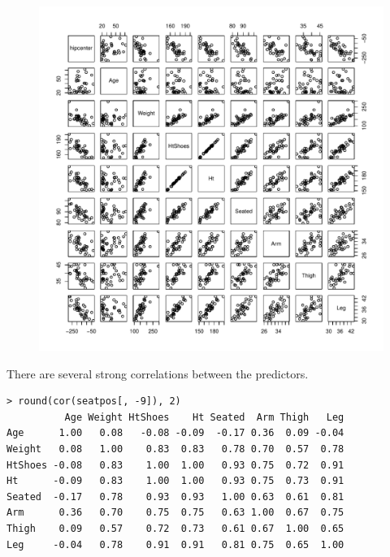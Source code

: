 \documentclass[10pt]{beamer}\usepackage[]{graphicx}\usepackage[]{color}
\begin{document}
\begin{frame}
\begin{figure}
\includegraphics[scale=0.5]{figure/seatpos_pairs.pdf}
\end{figure}
\end{frame}

\begin{frame}[fragile]
There are several strong correlations between the predictors.
\small
\begin{verbatim}
> round(cor(seatpos[, -9]), 2)
          Age Weight HtShoes    Ht Seated  Arm Thigh   Leg
Age      1.00   0.08   -0.08 -0.09  -0.17 0.36  0.09 -0.04
Weight   0.08   1.00    0.83  0.83   0.78 0.70  0.57  0.78
HtShoes -0.08   0.83    1.00  1.00   0.93 0.75  0.72  0.91
Ht      -0.09   0.83    1.00  1.00   0.93 0.75  0.73  0.91
Seated  -0.17   0.78    0.93  0.93   1.00 0.63  0.61  0.81
Arm      0.36   0.70    0.75  0.75   0.63 1.00  0.67  0.75
Thigh    0.09   0.57    0.72  0.73   0.61 0.67  1.00  0.65
Leg     -0.04   0.78    0.91  0.91   0.81 0.75  0.65  1.00
\end{verbatim}
\end{frame}
\end{document}
